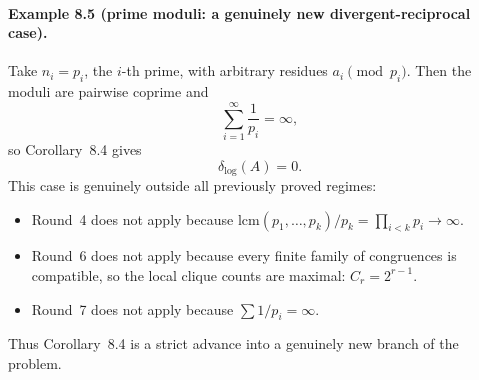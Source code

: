 \paragraph{Example 8.5 (prime moduli: a genuinely new divergent-reciprocal case).}
Take $n_i=p_i$, the $i$-th prime, with arbitrary residues $a_i\pmod{p_i}$.
Then the moduli are pairwise coprime and
\[
\sum_{i=1}^{\infty}\frac1{p_i}=\infty,
\]
so Corollary~8.4 gives
\begin{equation}
\delta_{\log}(A)=0.
\tag{8.14}
\end{equation}
This case is genuinely outside all previously proved regimes:
\begin{itemize}
\item Round~4 does not apply because
\(
\mathrm{lcm}(p_1,\dots,p_k)/p_k=\prod_{i<k}p_i\to\infty.
\)
\item Round~6 does not apply because every finite family of congruences is compatible, so the local clique counts are maximal:
\(
C_r=2^{r-1}.
\)
\item Round~7 does not apply because $\sum 1/p_i=\infty$.
\end{itemize}
Thus Corollary~8.4 is a strict advance into a genuinely new branch of the problem.

